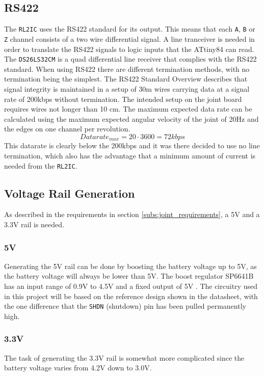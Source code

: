 \subsection{RS422}
The \texttt{RL2IC} uses the RS422 standard for its output.
This means that each \texttt{A}, \texttt{B} or \texttt{Z} channel consists of a two wire differential signal.
A line tranceiver is needed in order to translate the RS422 signals to logic inputs that the ATtiny84 can read.
The \texttt{DS26LS32CM} is a quad differential line receiver that complies with the RS422 standard.  
When using RS422 there are different termination methods, with no termination being the simplest.
The RS422 Standard Overview \cite{rs422_texas} describes that signal integrity is maintained in a setup of \approx 30m wires carrying data at a signal rate of 200kbps without termination.
The intended setup on the joint board requires wires not longer than 10 cm.
The maximum expected data rate can be calculated using the maximum expected angular velocity of the joint of 20Hz and the edges on one channel per revolution.
\begin{equation}
Datarate_{max}	= 20 \cdot 3600 = 72kbps
\end{equation}
This datarate is clearly below the 200kbps and it was there decided to use no line termination, which also has the advantage that a minimum amount of current is needed from the \texttt{RL2IC}.


\subsection{Voltage Rail Generation}
\label{sub:voltage_rail_generation}
As described in the requirements in section \ref{subs:joint_requirements}, a 5V and a 3.3V rail is needed. 

\subsubsection*{5V}
Generating the 5V rail can be done by boosting the battery voltage up to 5V, as the battery voltage will always be lower than 5V.
The boost regulator SP6641B \cite{sp6641b} has an input range of 0.9V to 4.5V and a fixed output of 5V \cite{sp6641b}.
The circuitry used in this project will be based on the reference design shown in the datasheet, with the one difference that the \texttt{SHDN} (shutdown) pin has been pulled permanently high.

\subsubsection*{3.3V}
The task of generating the 3.3V rail is somewhat more complicated since the battery voltage varies from 4.2V down to 3.0V.

